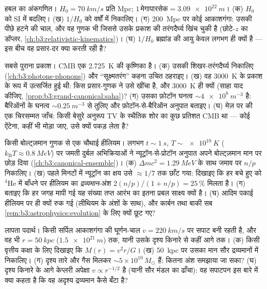 \begin{exercise}[$\star\star\star$]\label{exo:b3:astrophysics:9}
हबल का अंकगणित। $H_0 = \qty{70}{km/s}$ प्रति \unit{Mpc}; $1\,
\text{मेगापारसेक} = \qty{3.09e22}{m}$। (क) $H_0$ को SI में बदलिए। (ख)
$1/H_0$ को वर्षों में निकालिए। (ग) \qty{200}{Mpc} पर कोई आकाशगंगा: उसकी
पीछे हटने की चाल, और वह गुणक भी जिससे उसके प्रकाश की तरंगदैर्घ्य
खिंच चुकी है (छोटे-$z$ का डॉप्लर,
\cref{ch:b3:relativistic-kinematics})। (घ) $1/H_0$ ब्रह्मांड की आयु
केवल लगभग ही क्यों है --- इस बीच वह प्रसार-दर
क्या करती रही है?
\end{exercise}

\begin{exercise}[$\star\star\star$]\label{exo:b3:astrophysics:10}
सबसे पुराना प्रकाश। CMB एक \qty{2.725}{K} की कृष्णिका है। (क)
उसकी शिखर-तरंगदैर्घ्य निकालिए (\cref{ch:b3:photons-phonons}) और
``सूक्ष्मतरंग'' कहना उचित ठहराइए। (ख) वह
\qty{3000}{K} के प्रकाश के रूप में उत्सर्जित हुई थी: किस प्रसार-गुणक
ने उसे खींचा है, और \qty{3000}{K} ही क्यों (साहा याद कीजिए,
\cref{prop:b3:grand-canonical:saha})? (ग) उसका फ़ोटॉन घनत्व
$\sim\qty{4e8}{m^{-3}}$ है: बैरिऑनों के घनत्व
$\sim\qty{0.25}{m^{-3}}$ से तुलिए और फ़ोटॉन-से-बैरिऑन अनुपात बताइए।
(घ) मेज़ पर की एक चिरसम्मत जाँच: किसी बेसुरे अनुरूप
TV के स्थैतिक शोर का कुछ प्रतिशत CMB था --- कोई ऐंटेना, कहीं भी
मोड़ा जाए, उसे क्यों पकड़ लेता है?
\end{exercise}

\begin{exercise}[$\star\star\star$]\label{exo:b3:astrophysics:11}
किसी बोल्ट्ज़मान गुणक से एक चौथाई हीलियम। लगभग $t \sim
\qty{1}{s}$, $T \sim \qty{e10}{K}$ ($k_{\text{B}}T \approx
\qty{0.8}{MeV}$) पर जमती दुर्बल अभिक्रियाओं ने
न्यूट्रॉन-से-प्रोटॉन अनुपात अपने बोल्ट्ज़मान मान पर छोड़ दिया
(\cref{ch:b3:canonical-ensemble})। (क) $\Delta mc^2 =
\qty{1.29}{MeV}$ के साथ जमाव पर $n/p$ निकालिए। (ख) पहले मिनटों में
न्यूट्रॉन का क्षय उसे $\approx1/7$ तक छाँट गया: दिखाइए कि हर बचे हुए
को $^4$He में बाँधने पर हीलियम का \emph{द्रव्यमान}-अंश
$2(n/p)/(1 + n/p) = 25\,\%$ मिलता है। (ग) बताइए कि हर जगह मापी गई
यह संख्या तप्त आरंभ का इतना प्रबल साक्ष्य क्यों है। (घ) आदिम पकाई
हीलियम पर ही क्यों रुक गई (लीथियम के अंशों के साथ), और
कार्बन तथा बाकी सब \cref{rem:b3:astrophysics:evolution} के लिए क्यों छूट गए?
\end{exercise}

\begin{exercise}[$\star\star\star$]\label{exo:b3:astrophysics:12}
लापता पदार्थ। किसी सर्पिल आकाशगंगा की घूर्णन-चाल
$v = \qty{220}{km/s}$ पर सपाट बनी रहती है, और वह भी
$r = \qty{50}{kpc}$ ($\qty{1.5e21}{m}$) तक, यानी उसके दृश्य किनारे से
कहीं आगे तक। (क) किसी वृत्तीय कक्षा के लिए दिखाइए कि $M(r) = v^2r/G$।
(ख) \qty{50}{kpc} पर उसका मान सौर द्रव्यमानों में निकालिए। (ग)
दृश्य तारे और गैस मिलकर $\sim5\times10^{10}\,M_\odot$ हैं: कितना अंश
समझाया जा सका? (घ) दृश्य किनारे के आगे केप्लरी अपेक्षा
$v \propto r^{-1/2}$ है (यानी सौर मंडल का ढाँचा): वह सपाटपन इस बारे
में क्या कहता है कि वह अदृश्य द्रव्यमान कैसे बँटा है?
\end{exercise}

